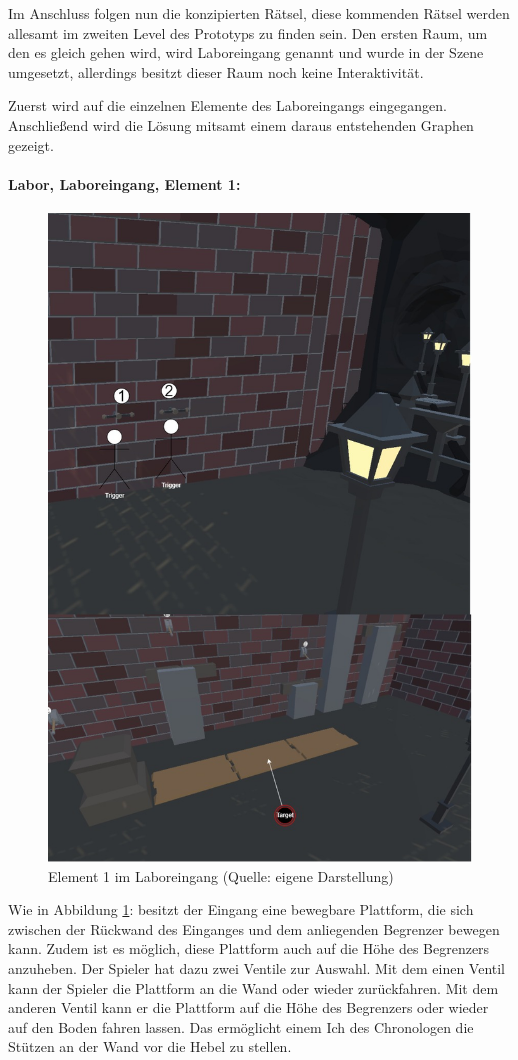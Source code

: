 Im Anschluss folgen nun die konzipierten Rätsel, diese kommenden Rätsel werden allesamt im zweiten Level des Prototyps zu finden sein. Den ersten Raum, um den es gleich gehen wird, wird Laboreingang genannt und wurde in der Szene umgesetzt, allerdings besitzt dieser Raum noch keine  Interaktivität.

Zuerst wird auf die einzelnen Elemente des Laboreingangs eingegangen. Anschließend wird die Lösung mitsamt einem daraus entstehenden Graphen gezeigt.

\paragraph{Labor, Laboreingang, Element 1:}\label{p:lle1}

\begin{figure}[ht]
\centering
\includegraphics[width=0.8\linewidth]{content/pictures/Raetsel-L02_R02_R01.jpg}
\caption{Element 1 im Laboreingang (Quelle: eigene Darstellung)}
\label{fig:L02_R02_R01}
\end{figure}

Wie in Abbildung \ref{fig:L02_R02_R01}:  besitzt der Eingang eine bewegbare Plattform, die sich zwischen der Rückwand des Einganges und dem anliegenden Begrenzer bewegen kann. Zudem ist es möglich, diese Plattform auch auf die Höhe des Begrenzers anzuheben. Der Spieler hat dazu zwei Ventile zur Auswahl. Mit dem einen Ventil kann der Spieler die Plattform an die Wand oder wieder zurückfahren. Mit dem anderen Ventil kann er die Plattform auf die Höhe des Begrenzers oder wieder auf den Boden fahren lassen. Das ermöglicht einem  Ich des Chronologen die Stützen an der Wand vor die Hebel zu stellen.

